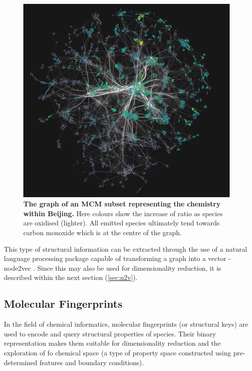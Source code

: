 \begin{figure}[H]
  \centering
  \includegraphics[width=\textwidth]{4fig/graph/oxidised_ratio.png}
  \caption{\textbf{The graph of an MCM subset representing the chemistry within Beijing.} Here colours show the increase of  ratio as species are oxidised (lighter). All emitted species ultimately tend towards carbon monoxide which is at the centre of the graph. }
  \label{fig:vk}
\end{figure}

This type of structural information can be extracted through the use of a natural language processing package capable of transforming a graph into a vector - node2vec \citep{node2vec}. Since this may also be used for dimensionality reduction, it is described within the next section (\autoref{sec:n2v}).




\subsection{Molecular Fingerprints}\label{sec:fingerprints}

In the field of chemical informatics, molecular fingerprints (or structural keys) are used to encode and query structural properties of species. Their binary representation makes them suitable for dimensionality reduction and the exploration of fo chemical space (a type of property space constructed using pre-determined features and boundary conditions).

